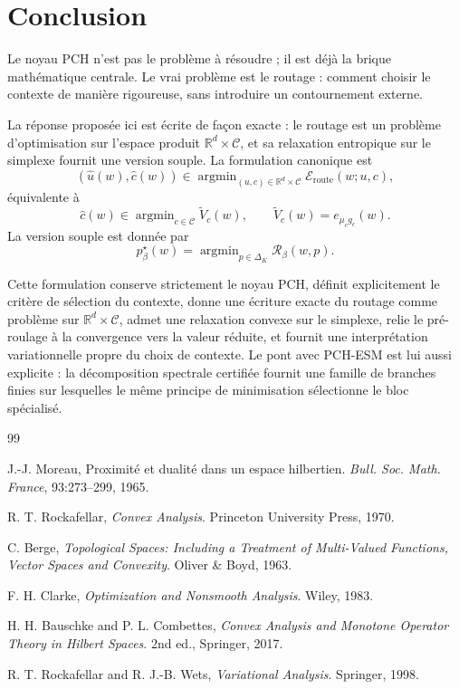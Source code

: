 \documentclass[11pt,a4paper]{article}
\DeclareMathOperator{\argmin}{argmin}
\newcommand{\R}{\mathbb R}
\newcommand{\Ccal}{\mathcal C}
\newcommand{\Rcal}{\mathcal R}
\begin{document}
\section{Conclusion}

Le noyau PCH n'est pas le problème à résoudre ; il est déjà la brique mathématique centrale. Le vrai problème est le routage : comment choisir le contexte de manière rigoureuse, sans introduire un contournement externe.

La réponse proposée ici est écrite de façon exacte : le routage est un problème d'optimisation sur l'espace produit \(\R^d\times\Ccal\), et sa relaxation entropique sur le simplexe fournit une version souple. La formulation canonique est
\[
(\hat u(w),\hat c(w))\in\argmin_{(u,c)\in\R^d\times\Ccal}\mathcal E_{\mathrm{route}}(w;u,c),
\]
équivalente à
\[
\hat c(w)\in\argmin_{c\in\Ccal}\widetilde V_c(w),
\qquad
\widetilde V_c(w)=e_{\mu_c g_c}(w).
\]
La version souple est donnée par
\[
p^\star_\beta(w)=\argmin_{p\in\Delta_K}\Rcal_\beta(w,p).
\]

Cette formulation conserve strictement le noyau PCH, définit explicitement le critère de sélection du contexte, donne une écriture exacte du routage comme problème sur \(\R^d\times\Ccal\), admet une relaxation convexe sur le simplexe, relie le pré-roulage à la convergence vers la valeur réduite, et fournit une interprétation variationnelle propre du choix de contexte. Le pont avec PCH-ESM est lui aussi explicite : la décomposition spectrale certifiée fournit une famille de branches finies sur lesquelles le même principe de minimisation sélectionne le bloc spécialisé.

\begin{thebibliography}{99}

J.-J. Moreau,
\newblock Proximité et dualité dans un espace hilbertien.
\newblock \emph{Bull. Soc. Math. France}, 93:273--299, 1965.

R. T. Rockafellar,
\newblock \emph{Convex Analysis}.
\newblock Princeton University Press, 1970.

C. Berge,
\newblock \emph{Topological Spaces: Including a Treatment of Multi-Valued Functions, Vector Spaces and Convexity}.
\newblock Oliver \& Boyd, 1963.

F. H. Clarke,
\newblock \emph{Optimization and Nonsmooth Analysis}.
\newblock Wiley, 1983.

H. H. Bauschke and P. L. Combettes,
\newblock \emph{Convex Analysis and Monotone Operator Theory in Hilbert Spaces}.
\newblock 2nd ed., Springer, 2017.

R. T. Rockafellar and R. J.-B. Wets,
\newblock \emph{Variational Analysis}.
\newblock Springer, 1998.

\end{thebibliography}
\end{document}
